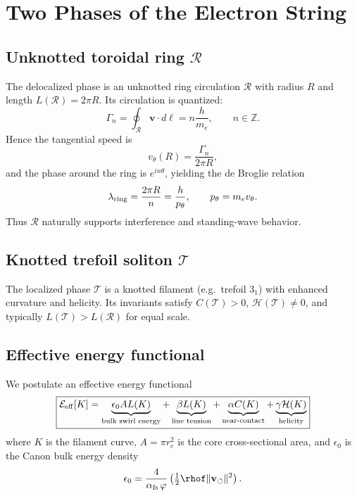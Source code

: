 \documentclass[11pt,a4paper]{article}
\begin{document}
\section{Two Phases of the Electron String}

    \subsection{Unknotted toroidal ring $\mathcal{R}$}

        The delocalized phase is an unknotted ring circulation $\mathcal{R}$ with radius $R$ and length $L(\mathcal{R})=2\pi R$. Its circulation is quantized:
\begin{equation}
            \Gamma_n = \oint_{\mathcal{R}} \mathbf{v} \cdot d\boldsymbol{\ell} = n \frac{h}{m_e}, \qquad n\in \mathbb{Z} .
\end{equation}
Hence the tangential speed is
\begin{equation}
    v_\theta(R) = \frac{\Gamma_n}{2\pi R},
\end{equation}
        and the phase around the ring is $e^{i n\theta}$, yielding the de Broglie relation
\begin{equation}
    \lambda_{\rm ring} = \frac{2\pi R}{n} = \frac{h}{p_\theta}, \qquad p_\theta = m_e v_\theta .
\end{equation}
        Thus $\mathcal{R}$ naturally supports interference and standing-wave behavior.

    \subsection{Knotted trefoil soliton $\mathcal{T}$}

        The localized phase $\mathcal{T}$ is a knotted filament (e.g.\ trefoil $3_1$) with enhanced curvature and helicity. Its invariants satisfy $C(\mathcal{T})>0$, $\mathcal{H}(\mathcal{T})\neq 0$, and typically $L(\mathcal{T})>L(\mathcal{R})$ for equal scale.

\subsection{Effective energy functional}

We postulate an effective energy functional
\begin{equation}
    \boxed{
        \mathcal{E}_{\rm eff}[K] =
        \underbrace{\epsilon_0 A L(K)}_{\text{bulk swirl energy}} +
        \underbrace{\beta L(K)}_{\text{line tension}} +
        \underbrace{\alpha C(K)}_{\text{near-contact}} +
        \underbrace{\gamma \mathcal{H}(K)}_{\text{helicity}}
    }
\end{equation}
        where $K$ is the filament curve, $A=\pi r_c^2$ is the core cross-sectional area, and $\epsilon_0$ is the Canon bulk energy density
\begin{equation}
            \epsilon_0 = \frac{4}{\alpha_{\rm fs}\,\varphi}\left(\tfrac12 \rhof \|\mathbf{v}_{\circlearrowleft}\|^2\right).
\end{equation}
\end{document}
